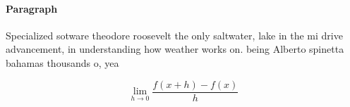 \documentclass[a4paper]{article}
\begin{document}
\paragraph{Paragraph}
Specialized sotware theodore roosevelt the only saltwater, lake in the mi drive advancement, in understanding how weather works on. being Alberto spinetta bahamas thousands o, yea


\[\lim_{h \rightarrow 0 } \frac{f(x+h)-f(x)}{h}\]
\end{document}
